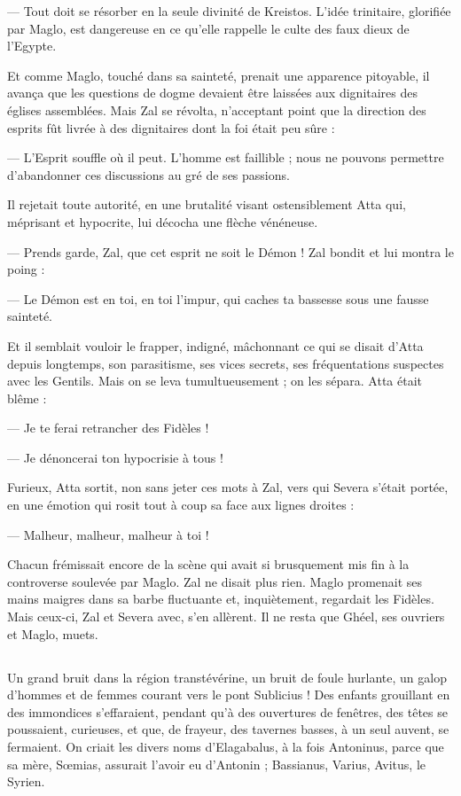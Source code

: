 \documentclass[a4paper, 11pt, oneside, polutonikogreek, french]{article}
\begin{document}
--- Tout doit se résorber en la seule divinité de Kreistos. L'idée trinitaire, glorifiée par Maglo, est dangereuse en ce qu'elle rappelle le culte des faux dieux de l'Egypte.

Et comme Maglo, touché dans sa sainteté, prenait une apparence pitoyable, il avança que les questions de dogme devaient être laissées aux dignitaires des églises assemblées. Mais Zal se révolta, n'acceptant point que la direction des esprits fût livrée à des dignitaires dont la foi était peu sûre :

--- L'Esprit souffle où il peut. L'homme est faillible ; nous ne pouvons permettre d'abandonner ces discussions au gré de ses passions.

Il rejetait toute autorité, en une brutalité visant ostensiblement Atta qui, méprisant et hypocrite, lui décocha une flèche vénéneuse.

--- Prends garde, Zal, que cet esprit ne soit le Démon ! Zal bondit et lui montra le poing :

--- Le Démon est en toi, en toi l'impur, qui caches ta bassesse sous une fausse sainteté.

Et il semblait vouloir le frapper, indigné, mâchonnant ce qui se disait d'Atta depuis longtemps, son parasitisme, ses vices secrets, ses fréquentations suspectes avec les Gentils. Mais on se leva tumultueusement ; on les sépara. Atta était blême :

--- Je te ferai retrancher des Fidèles !

--- Je dénoncerai ton hypocrisie à tous !

Furieux, Atta sortit, non sans jeter ces mots à Zal, vers qui Severa s'était portée, en une émotion qui rosit tout à coup sa face aux lignes droites :

--- Malheur, malheur, malheur à toi !

Chacun frémissait encore de la scène qui avait si brusquement mis fin à la controverse soulevée par Maglo. Zal ne disait plus rien. Maglo promenait ses mains maigres dans sa barbe fluctuante et, inquiètement, regardait les Fidèles. Mais ceux-ci, Zal et Severa avec, s'en allèrent. Il ne resta que Ghéel, ses ouvriers et Maglo, muets.
\clearpage
\subsection{}
\paragraph{}
Un grand bruit dans la région transtévérine, un bruit de foule hurlante, un galop d'hommes et de femmes courant vers le pont Sublicius ! Des enfants grouillant en des immondices s'effaraient, pendant qu'à des ouvertures de fenêtres, des têtes se poussaient, curieuses, et que, de frayeur, des tavernes basses, à un seul auvent, se fermaient. On criait les divers noms d'Elagabalus, à la fois Antoninus, parce que sa mère, Sœmias, assurait l'avoir eu d'Antonin ; Bassianus, Varius, Avitus, le Syrien.
\end{document}

